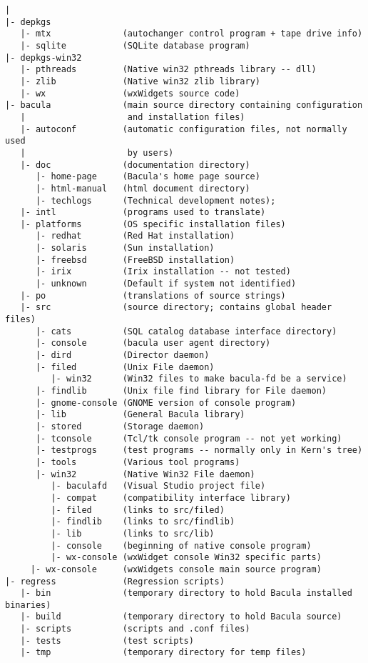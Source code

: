 \footnotesize
\begin{verbatim}
|
|- depkgs
   |- mtx              (autochanger control program + tape drive info)
   |- sqlite           (SQLite database program)
|- depkgs-win32
   |- pthreads         (Native win32 pthreads library -- dll)
   |- zlib             (Native win32 zlib library)
   |- wx               (wxWidgets source code)
|- bacula              (main source directory containing configuration
   |                    and installation files)
   |- autoconf         (automatic configuration files, not normally used
   |                    by users)
   |- doc              (documentation directory)
      |- home-page     (Bacula's home page source)
      |- html-manual   (html document directory)
      |- techlogs      (Technical development notes);
   |- intl             (programs used to translate)
   |- platforms        (OS specific installation files)
      |- redhat        (Red Hat installation)
      |- solaris       (Sun installation)
      |- freebsd       (FreeBSD installation)
      |- irix          (Irix installation -- not tested)
      |- unknown       (Default if system not identified)
   |- po               (translations of source strings)
   |- src              (source directory; contains global header files)
      |- cats          (SQL catalog database interface directory)
      |- console       (bacula user agent directory)
      |- dird          (Director daemon)
      |- filed         (Unix File daemon)
         |- win32      (Win32 files to make bacula-fd be a service)
      |- findlib       (Unix file find library for File daemon)
      |- gnome-console (GNOME version of console program)
      |- lib           (General Bacula library)
      |- stored        (Storage daemon)
      |- tconsole      (Tcl/tk console program -- not yet working)
      |- testprogs     (test programs -- normally only in Kern's tree)
      |- tools         (Various tool programs)
      |- win32         (Native Win32 File daemon)
         |- baculafd   (Visual Studio project file)
         |- compat     (compatibility interface library)
         |- filed      (links to src/filed)
         |- findlib    (links to src/findlib)
         |- lib        (links to src/lib)
         |- console    (beginning of native console program)
         |- wx-console (wxWidget console Win32 specific parts)
     |- wx-console     (wxWidgets console main source program)
|- regress             (Regression scripts)
   |- bin              (temporary directory to hold Bacula installed binaries)
   |- build            (temporary directory to hold Bacula source)
   |- scripts          (scripts and .conf files)
   |- tests            (test scripts)
   |- tmp              (temporary directory for temp files)
\end{verbatim}
\normalsize

